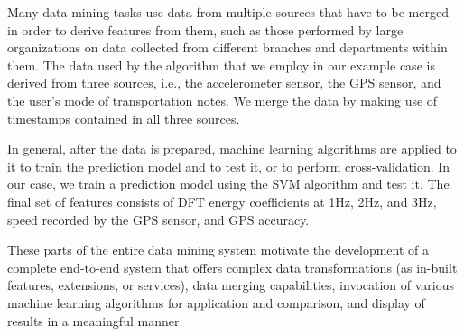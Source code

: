 Many data mining tasks use data from multiple sources that have to be merged in order to derive features from them, such as those performed by large organizations on data collected from different branches and departments within them. The data used by the algorithm that we employ in our example case is derived from three sources, i.e., the accelerometer sensor, the GPS sensor, and the user’s mode of transportation notes. We merge the data by making use of timestamps contained in all three sources.

In general, after the data is prepared, machine learning algorithms are applied to it to train the prediction model and to test it, or to perform cross-validation. In our case, we train a prediction model using the SVM algorithm and test it. The final set of features consists of DFT energy coefficients at 1Hz, 2Hz, and 3Hz, speed recorded by the GPS sensor, and GPS accuracy.

These parts of the entire data mining system motivate the development of a complete end-to-end system that offers complex data transformations (as in-built features, extensions, or services), data merging capabilities, invocation of various machine learning algorithms for application and comparison, and display of results in a meaningful manner.